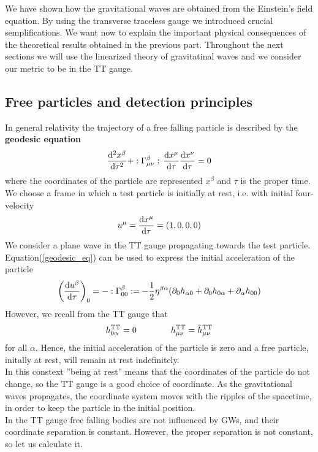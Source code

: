 We have shown how the gravitational waves are obtained from the Einstein's field equation. 
By using the transverse traceless gauge we introduced crucial semplifications. 
We want now to explain the important physical consequences of the theoretical results obtained in the previous part.
Throughout the next sections we will use the linearized theory of gravitatinal waves and we consider our metric to be in the TT gauge.
\subsection{Free particles and detection principles}
In general relativity the trajectory of a free falling particle is described by the \textbf{geodesic equation}
\begin{equation}
\label{geodesic_eq}
\dv[2]{x^{\beta}}{\tau} + :\Gamma^{\beta} _{\mu \nu}: \,\dv{x^{\mu}}{\tau} \dv{x^{\nu}}{\tau} = 0
\end{equation}
where the coordinates of the particle are represented $x^{\beta}$ and $\tau$ is the proper time.\\
We choose a frame in which a test particle is initially at rest, i.e. with initial four-velocity
\[
u^{\mu} = \dv{x^{\mu}}{\tau} = (1,0,0,0)
\]
We consider a plane wave in the TT gauge propagating towards the test particle. \\
Equation(\ref{geodesic_eq}) can be used to express the initial acceleration of the particle
\[
\qty(
\dv{u^{\beta}}{\tau} 
)_{0}
=
- :\Gamma^{\beta} _{0 0}: 
= -\dfrac{1}{2} \eta ^{\beta \alpha}
\qty(
\partial_{0} h_{\alpha 0} + 
\partial_{0} h_{0 \alpha} + 
\partial_{\alpha} h_{0 0}
)
\]
However, we recall from the TT gauge that
\[
h^{\text{TT}}_{0 \alpha} = 0 \qquad  \qquad h^{\text{TT}}_{\mu \nu} = \bar{h}^{\text{TT}}_{\mu \nu} 
\]
for all $\alpha$. Hence, the initial acceleration of the particle is zero and a free particle, initally at rest, will remain at rest indefinitely.\\
In this constext ''being at rest'' means that the coordinates of the particle do not change, so the TT gauge is a good choice of coordinate. As the gravitational waves propagates, the coordinate system moves with the ripples of the spacetime, in order to keep the particle in the initial position. \\
In the TT gauge free falling bodies are not influenced by  GWs, and their coordinate separation is constant. However, the proper separation is not constant, so let us calculate it.\\
